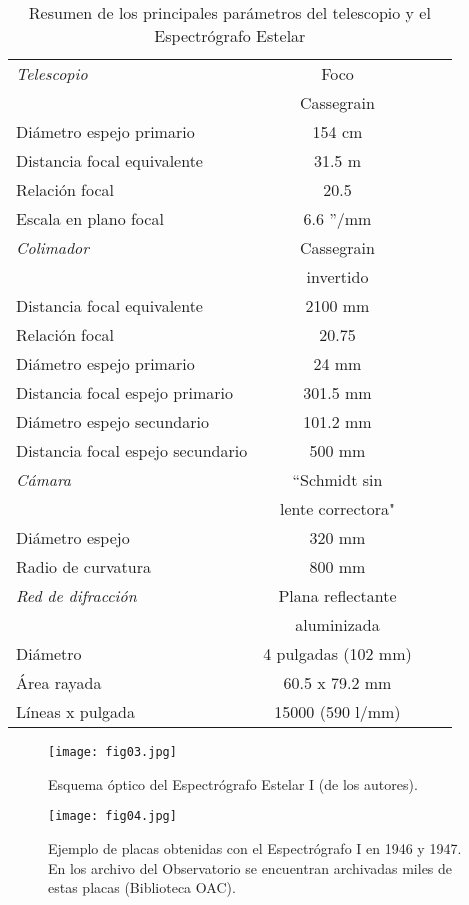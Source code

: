 \documentclass[baaa]{baaa}
\begin{document}
\begin{table}[!t]
\centering
\caption{Resumen de los principales parámetros del telescopio y el Espectrógrafo Estelar}
\begin{tabular}{lccc}
\hline\hline\noalign{\smallskip}
\!\!\emph{Telescopio} & Foco\\
\!\!  & Cassegrain\\
\!\!Diámetro espejo primario & 154 cm\\
\!\!Distancia focal equivalente & 31.5 m\\
\!\!Relación focal & 20.5\\
\!\!Escala en plano focal & 6.6 ''/mm\\
\hline\noalign{\smallskip}
\!\!\emph{Colimador} & Cassegrain\\
\!\!  &  invertido\\
\!\!Distancia focal equivalente & 2100 mm\\
\!\!Relación focal & 20.75\\
\!\!Diámetro espejo primario & 24 mm\\
\!\!Distancia focal espejo primario & 301.5 mm\\
\!\!Diámetro espejo secundario & 101.2 mm\\
\!\!Distancia focal espejo secundario & 500 mm\\
\hline\noalign{\smallskip}
\!\!\emph{Cámara} & “Schmidt sin\\
\!\!  & lente correctora"\\
\!\!Diámetro espejo & 320 mm\\
\!\!Radio de curvatura & 800 mm\\
\hline\noalign{\smallskip}
\!\!\emph{Red de difracción} & Plana reflectante\\
\!\!  & aluminizada\\
\!\!Diámetro & 4 pulgadas (102 mm)\\
\!\!Área rayada & 60.5 x 79.2 mm\\
\!\!Líneas x pulgada & 15000 (590 l/mm)\\
\hline
\end{tabular}
\label{tabla1}
\end{table}

\begin{figure*}[!t]
\centering
\texttt{[image: fig03.jpg]}
\caption{Esquema óptico del Espectrógrafo Estelar I (de los autores).}
\label{Figura3}
\end{figure*}

\begin{figure}[!t]
\centering
\texttt{[image: fig04.jpg]}
\caption{Ejemplo de placas obtenidas con el Espectrógrafo I en 1946 y 1947. En los archivo del Observatorio se encuentran archivadas miles de estas placas (Biblioteca OAC).}
\label{Figura4}
\end{figure}
\end{document}
